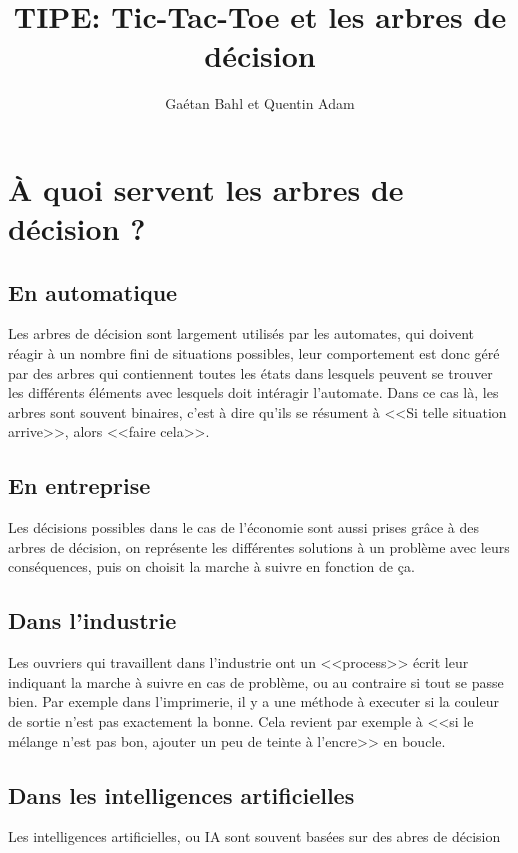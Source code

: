 \documentclass{article}
\title{TIPE: Tic-Tac-Toe et les arbres de décision}
\author{Gaétan Bahl et Quentin Adam}
\begin{document}
\maketitle
\tableofcontents

\pagebreak

\section{\uppercase{à} quoi servent les arbres de décision ?}

\subsection{En automatique}

Les arbres de décision sont largement utilisés par les automates,
 qui doivent réagir à un nombre fini de situations possibles, 
leur comportement est donc géré par des arbres qui contiennent
 toutes les états dans lesquels peuvent se trouver les différents 
éléments avec lesquels doit intéragir l'automate.
Dans ce cas là, les arbres sont souvent binaires, 
c'est à dire qu'ils se résument à <<Si telle situation arrive>>, alors <<faire cela>>.

\subsection{En entreprise}

Les décisions possibles dans le cas de l'économie sont aussi prises grâce à des arbres de décision,
on représente les différentes solutions à un problème avec leurs conséquences, puis on choisit 
la marche à suivre en fonction de ça.

\subsection{Dans l'industrie}

Les ouvriers qui travaillent dans l'industrie ont un <<process>> écrit 
leur indiquant la marche à suivre en cas de problème, 
ou au contraire si tout se passe bien. Par exemple dans l'imprimerie, il y a une méthode à executer si la 
couleur de sortie n'est pas exactement la bonne.
Cela revient par exemple à <<si le mélange n'est pas bon, ajouter un peu de teinte à l'encre>> en boucle.

\subsection{Dans les intelligences artificielles}

Les intelligences artificielles, ou IA sont souvent basées sur des abres de décision 
\end{document}
